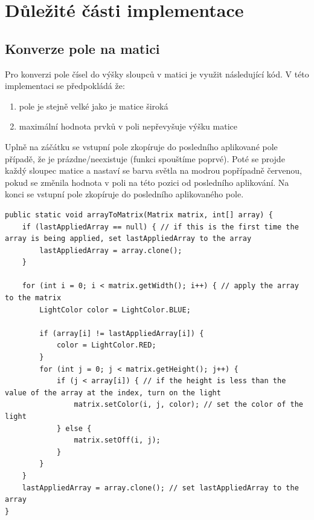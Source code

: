 \documentclass{article}
\begin{document}
\section{Důležité části implementace}
\subsection{Konverze pole na matici}
Pro konverzi pole čísel do výšky sloupců v matici je využit následující kód.
V této implementaci se předpokládá že:
\begin{enumerate}
    \item pole je stejně velké jako je matice široká
    \item maximální hodnota prvků v poli nepřevyšuje výšku matice
\end{enumerate}

Uplně na záčátku se vstupní pole zkopíruje do posledního aplikované pole případě, že je prázdne/neexistuje (funkci spouštíme poprvé).
Poté se projde každý sloupec matice a nastaví se barva světla na modrou popřípadně červenou, pokud se změnila hodnota v poli na této pozici od posledního aplikování.
Na konci se vstupní pole zkopíruje do posledního aplikovaného pole.
\begin{verbatim}
public static void arrayToMatrix(Matrix matrix, int[] array) {
    if (lastAppliedArray == null) { // if this is the first time the array is being applied, set lastAppliedArray to the array
        lastAppliedArray = array.clone();
    }

    for (int i = 0; i < matrix.getWidth(); i++) { // apply the array to the matrix
        LightColor color = LightColor.BLUE;

        if (array[i] != lastAppliedArray[i]) {
            color = LightColor.RED;
        }
        for (int j = 0; j < matrix.getHeight(); j++) {
            if (j < array[i]) { // if the height is less than the value of the array at the index, turn on the light
                matrix.setColor(i, j, color); // set the color of the light
            } else {
                matrix.setOff(i, j);
            }
        }
    }
    lastAppliedArray = array.clone(); // set lastAppliedArray to the array
}
\end{verbatim}
\end{document}
